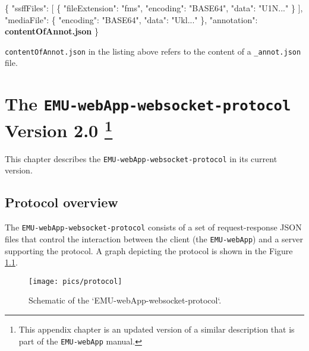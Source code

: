 \documentclass[
]{book}
\newenvironment{Shaded}{\begin{snugshade}}{\end{snugshade}}
\newcommand{\DataTypeTok}[1]{\textcolor[rgb]{0.13,0.29,0.53}{#1}}
\newcommand{\ErrorTok}[1]{\textcolor[rgb]{0.64,0.00,0.00}{\textbf{#1}}}
\newcommand{\FunctionTok}[1]{\textcolor[rgb]{0.00,0.00,0.00}{#1}}
\newcommand{\OtherTok}[1]{\textcolor[rgb]{0.56,0.35,0.01}{#1}}
\newcommand{\StringTok}[1]{\textcolor[rgb]{0.31,0.60,0.02}{#1}}
\begin{document}
\begin{Shaded}
\begin{Highlighting}[]
\FunctionTok{\{}
 \DataTypeTok{"ssffFiles"}\FunctionTok{:} \OtherTok{[}
  \FunctionTok{\{}
   \DataTypeTok{"fileExtension"}\FunctionTok{:} \StringTok{"fms"}\FunctionTok{,}
   \DataTypeTok{"encoding"}\FunctionTok{:} \StringTok{"BASE64"}\FunctionTok{,}
   \DataTypeTok{"data"}\FunctionTok{:} \StringTok{"U1N..."}
  \FunctionTok{\}}
 \OtherTok{]}\FunctionTok{,}
 \DataTypeTok{"mediaFile"}\FunctionTok{:} \FunctionTok{\{}
  \DataTypeTok{"encoding"}\FunctionTok{:} \StringTok{"BASE64"}\FunctionTok{,}
  \DataTypeTok{"data"}\FunctionTok{:} \StringTok{"Ukl..."}
 \FunctionTok{\},}
 \DataTypeTok{"annotation"}\FunctionTok{:} \ErrorTok{contentOfAnnot.json}
\FunctionTok{\}}
\end{Highlighting}
\end{Shaded}

\texttt{contentOfAnnot.json} in the listing above refers to the content of a \texttt{\_annot.json} file.

\hypertarget{app-chap:wsProtocol}{%
\chapter[The \texttt{EMU-webApp-websocket-protocol} Version 2.0 ]{\texorpdfstring{The \texttt{EMU-webApp-websocket-protocol} Version 2.0 \footnote{This appendix chapter is an updated version of a similar description that is part of the \texttt{EMU-webApp} manual.}}{The EMU-webApp-websocket-protocol Version 2.0 }}\label{app-chap:wsProtocol}}

This chapter describes the \texttt{EMU-webApp-websocket-protocol} in its current version.

\hypertarget{protocol-overview}{%
\section{Protocol overview}\label{protocol-overview}}

The \texttt{EMU-webApp-websocket-protocol} consists of a set of request-response JSON files that control the interaction between the client (the \texttt{EMU-webApp}) and a server supporting the protocol. A graph depicting the protocol is shown in the Figure \ref{fig:app-chapWsProtocolGraph}.

\begin{figure}

{\centering \texttt{[image: pics/protocol]} 

}

\caption{Schematic of the `EMU-webApp-websocket-protocol`.}\label{fig:app-chapWsProtocolGraph}
\end{figure}
\end{document}
